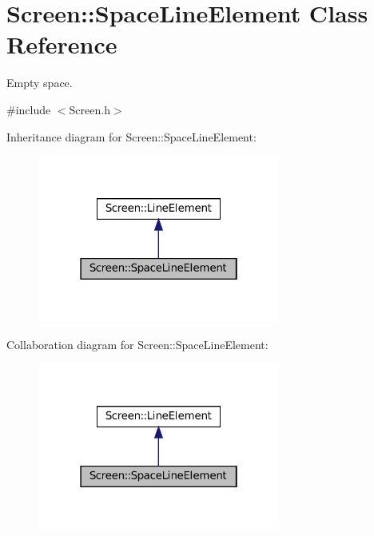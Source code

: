 \hypertarget{classScreen_1_1SpaceLineElement}{}\section{Screen\+:\+:Space\+Line\+Element Class Reference}
\label{classScreen_1_1SpaceLineElement}


Empty space.  




{\ttfamily \#include $<$Screen.\+h$>$}



Inheritance diagram for Screen\+:\+:Space\+Line\+Element\+:\nopagebreak
\begin{figure}[H]
\begin{center}
\leavevmode
\includegraphics[width=226pt]{classScreen_1_1SpaceLineElement__inherit__graph}
\end{center}
\end{figure}


Collaboration diagram for Screen\+:\+:Space\+Line\+Element\+:\nopagebreak
\begin{figure}[H]
\begin{center}
\leavevmode
\includegraphics[width=226pt]{classScreen_1_1SpaceLineElement__coll__graph}
\end{center}
\end{figure}
